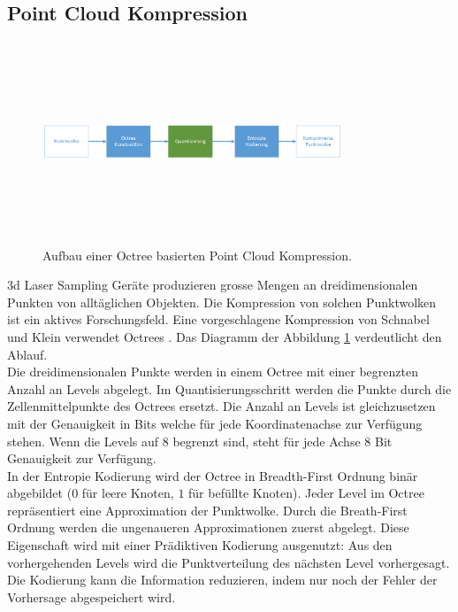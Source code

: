 \subsection{Point Cloud Kompression} \label{state:pointcloud}
\begin{figure}[!htbp]
	\center
	\includegraphics[width=0.8\textwidth,height=6cm,keepaspectratio]{./pictures/state/pointcloud.png}
	\caption{Aufbau einer Octree basierten Point Cloud Kompression.}
	\label{state:pointcloud:abb}
\end{figure}
3d Laser Sampling Geräte produzieren grosse Mengen an dreidimensionalen Punkten von alltäglichen Objekten. Die Kompression von solchen Punktwolken ist ein aktives Forschungsfeld. Eine vorgeschlagene Kompression  von Schnabel und Klein \cite{schnabel2006octree} verwendet Octrees \cite{wiki:octree}. Das Diagramm der Abbildung \ref{state:pointcloud:abb} verdeutlicht den Ablauf.\\
Die dreidimensionalen Punkte werden in einem Octree mit einer begrenzten Anzahl an Levels abgelegt. Im Quantisierungsschritt werden die Punkte durch die Zellenmittelpunkte des Octrees ersetzt. Die Anzahl an Levels ist gleichzusetzen mit der Genauigkeit in Bits welche für jede Koordinatenachse zur Verfügung stehen. Wenn die Levels auf $8$ begrenzt sind, steht für jede Achse $8$ Bit Genauigkeit zur Verfügung.\\
In der Entropie Kodierung wird der Octree in Breadth-First Ordnung binär abgebildet ($0$ für leere Knoten, $1$ für befüllte Knoten). Jeder Level im Octree repräsentiert eine Approximation der Punktwolke. Durch  die Breath-First Ordnung werden die ungenaueren Approximationen zuerst abgelegt. Diese Eigenschaft wird mit einer Prädiktiven Kodierung ausgenutzt: Aus den vorhergehenden Levels wird die Punktverteilung des nächsten Level vorhergesagt. Die Kodierung kann die Information reduzieren, indem nur noch der Fehler der Vorhersage abgespeichert wird.

